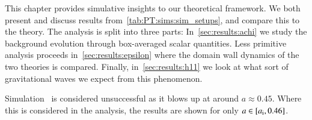 


\newcommand{\lbl}[1]{\textsf{\textbf{#1}}}
\newcommand{\completelbl}[4]{%
\textbf{#1)}%
\textbf{#2:}%
\lbl{#3.#4}%
}
\newcommand{\lcoord}{\ALIASlcoord}
\newcommand{\lcoordx}{\ALIASlcoordx}
\newcommand{\lcoordk}{\ALIASlcoordk}
\newcommand{\epsA}{\ALIASepsA}
\newcommand{\epsB}{\ALIASepsB}
\newcommand{\epsC}{\ALIASepsC}









This chapter provides simulative insights to our theoretical framework. We both present and discuss results from~\cref{tab:PT:sims:sim_setups}, and compare this to the theory. The analysis is split into three parts: In~\cref{sec:results:achi} we study the background evolution through box-averaged scalar quantities. Less primitive analysis proceeds in~\cref{sec:results:epsilon} where the domain wall dynamics of the two theories is compared. Finally, in~\cref{sec:results:h11} we look at what sort of gravitational waves we expect from this phenomenon. 




Simulation~ is considered unsuccessful as it blows up at around $a\approx 0.45$. Where this is considered in the analysis, the results are shown for only $a\in [a_\mathrm{i}, 0.46]$. 

















